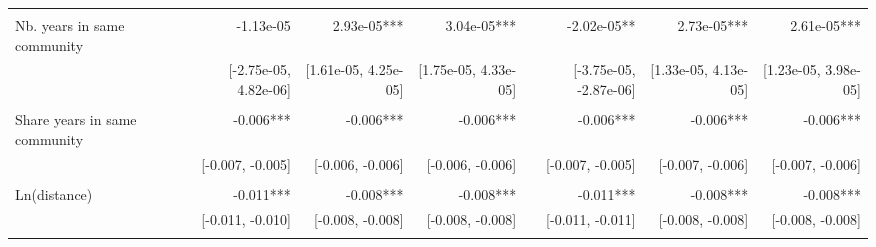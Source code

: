 \begin{table}[!h]
\begin{tabular}{lllllll}
  \multicolumn{1}{r}{} &
  \multicolumn{1}{r}{} &
  \multicolumn{1}{r}{} &
  \multicolumn{1}{r}{} \\
\multicolumn{1}{l}{Nb. years in same community} &
  \multicolumn{1}{|r}{-1.13e-05} &
  \multicolumn{1}{r}{2.93e-05***} &
  \multicolumn{1}{r}{3.04e-05***} &
  \multicolumn{1}{r}{-2.02e-05**} &
  \multicolumn{1}{r}{2.73e-05***} &
  \multicolumn{1}{r}{2.61e-05***} \\
\multicolumn{1}{l}{} &
  \multicolumn{1}{|r}{[-2.75e-05,  4.82e-06]} &
  \multicolumn{1}{r}{[1.61e-05,  4.25e-05]} &
  \multicolumn{1}{r}{[1.75e-05,  4.33e-05]} &
  \multicolumn{1}{r}{[-3.75e-05, -2.87e-06]} &
  \multicolumn{1}{r}{[1.33e-05,  4.13e-05]} &
  \multicolumn{1}{r}{[1.23e-05,  3.98e-05]} \\
\multicolumn{1}{l}{} &
  \multicolumn{1}{|r}{} &
  \multicolumn{1}{r}{} &
  \multicolumn{1}{r}{} &
  \multicolumn{1}{r}{} &
  \multicolumn{1}{r}{} &
  \multicolumn{1}{r}{} \\
\multicolumn{1}{l}{Share years in same community} &
  \multicolumn{1}{|r}{-0.006***} &
  \multicolumn{1}{r}{-0.006***} &
  \multicolumn{1}{r}{-0.006***} &
  \multicolumn{1}{r}{-0.006***} &
  \multicolumn{1}{r}{-0.006***} &
  \multicolumn{1}{r}{-0.006***} \\
\multicolumn{1}{l}{} &
  \multicolumn{1}{|r}{[-0.007,  -0.005]} &
  \multicolumn{1}{r}{[-0.006,  -0.006]} &
  \multicolumn{1}{r}{[-0.006,  -0.006]} &
  \multicolumn{1}{r}{[-0.007,  -0.005]} &
  \multicolumn{1}{r}{[-0.007,  -0.006]} &
  \multicolumn{1}{r}{[-0.007,  -0.006]} \\
\multicolumn{1}{l}{} &
  \multicolumn{1}{|r}{} &
  \multicolumn{1}{r}{} &
  \multicolumn{1}{r}{} &
  \multicolumn{1}{r}{} &
  \multicolumn{1}{r}{} &
  \multicolumn{1}{r}{} \\
\multicolumn{1}{l}{Ln(distance)} &
  \multicolumn{1}{|r}{-0.011***} &
  \multicolumn{1}{r}{-0.008***} &
  \multicolumn{1}{r}{-0.008***} &
  \multicolumn{1}{r}{-0.011***} &
  \multicolumn{1}{r}{-0.008***} &
  \multicolumn{1}{r}{-0.008***} \\
\multicolumn{1}{l}{} &
  \multicolumn{1}{|r}{[-0.011,  -0.010]} &
  \multicolumn{1}{r}{[-0.008,  -0.008]} &
  \multicolumn{1}{r}{[-0.008,  -0.008]} &
  \multicolumn{1}{r}{[-0.011,  -0.011]} &
  \multicolumn{1}{r}{[-0.008,  -0.008]} &
  \multicolumn{1}{r}{[-0.008,  -0.008]} \\
\multicolumn{1}{l}{} &
  \multicolumn{1}{|r}{} &
  \multicolumn{1}{r}{} &
  \multicolumn{1}{r}{} &
  \multicolumn{1}{r}{} &
  \multicolumn{1}{r}{} &
  \multicolumn{1}{r}{} \\

\end{tabular}
\end{table}
